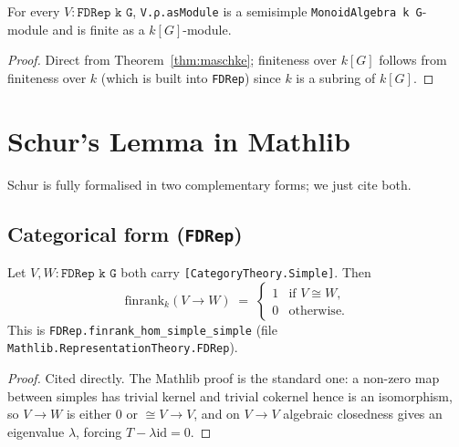 \begin{corollary}
  \label{cor:fdrep-semisimple}
  For every $V : \texttt{FDRep k G}$, \texttt{V.ρ.asModule} is a semisimple
  \texttt{MonoidAlgebra k G}-module and is finite as a $k[G]$-module.
\end{corollary}

\begin{proof}
  Direct from Theorem~\ref{thm:maschke}; finiteness over $k[G]$ follows from
  finiteness over $k$ (which is built into \texttt{FDRep}) since $k$ is a
  subring of $k[G]$.
\end{proof}


\chapter{Schur's Lemma in Mathlib}
\label{chap:schur}

Schur is fully formalised in two complementary forms; we just cite both.

\section{Categorical form (\texttt{FDRep})}

\begin{theorem}
  \label{thm:schur-fdrep}
  \mathlibok
  \leanok
  Let $V, W : \texttt{FDRep k G}$ both carry \texttt{[CategoryTheory.Simple]}.
  Then
  \[
     \mathrm{finrank}_k(V \to W) \;=\; \begin{cases}
       1 & \text{if } V \cong W,\\ 0 & \text{otherwise.} \end{cases}
  \]
  This is \texttt{FDRep.finrank\_hom\_simple\_simple} (file
  \texttt{Mathlib.RepresentationTheory.FDRep}).
\end{theorem}

\begin{proof}
  \leanok
  Cited directly. The Mathlib proof is the standard one: a non-zero map
  between simples has trivial kernel and trivial cokernel hence is an
  isomorphism, so $V \to W$ is either $0$ or $\cong V \to V$, and on
  $V \to V$ algebraic closedness gives an eigenvalue $\lambda$, forcing
  $T - \lambda \mathrm{id} = 0$.
\end{proof}

